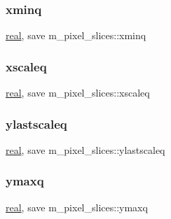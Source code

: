 \subsubsection{\texorpdfstring{xminq}{xminq}}
{\footnotesize\ttfamily \hyperlink{read__watch_83_8txt_abdb62bde002f38ef75f810d3a905a823}{real}, save m\+\_\+pixel\+\_\+slices\+::xminq\hspace{0.3cm}{\ttfamily [private]}}

\mbox{\label{namespacem__pixel__slices_aea975665739d351db83cfcc41e1914db}} 
\subsubsection{\texorpdfstring{xscaleq}{xscaleq}}
{\footnotesize\ttfamily \hyperlink{read__watch_83_8txt_abdb62bde002f38ef75f810d3a905a823}{real}, save m\+\_\+pixel\+\_\+slices\+::xscaleq\hspace{0.3cm}{\ttfamily [private]}}

\mbox{\label{namespacem__pixel__slices_a15c58d927d442047ca7d648b32b0971a}} 
\subsubsection{\texorpdfstring{ylastscaleq}{ylastscaleq}}
{\footnotesize\ttfamily \hyperlink{read__watch_83_8txt_abdb62bde002f38ef75f810d3a905a823}{real}, save m\+\_\+pixel\+\_\+slices\+::ylastscaleq\hspace{0.3cm}{\ttfamily [private]}}

\mbox{\label{namespacem__pixel__slices_a9f789eabf3f49da6fdd6c713642836c5}} 
\subsubsection{\texorpdfstring{ymaxq}{ymaxq}}
{\footnotesize\ttfamily \hyperlink{read__watch_83_8txt_abdb62bde002f38ef75f810d3a905a823}{real}, save m\+\_\+pixel\+\_\+slices\+::ymaxq\hspace{0.3cm}{\ttfamily [private]}}

